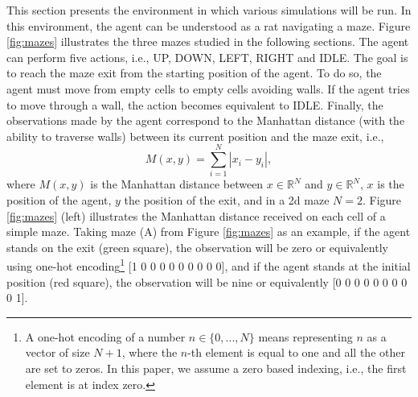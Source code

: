\documentclass[twoside,11pt]{article}
\begin{document}
This section presents the environment in which various simulations will be run. In this environment, the agent can be understood as a rat navigating a maze. Figure \ref{fig:mazes} illustrates the three mazes studied in the following sections. The agent can perform five actions, i.e., UP, DOWN, LEFT, RIGHT and IDLE. The goal is to reach the maze exit from the starting position of the agent. To do so, the agent must move from empty cells to empty cells avoiding walls. If the agent tries to move through a wall, the action becomes equivalent to IDLE. Finally, the observations made by the agent correspond to the Manhattan distance (with the ability to traverse walls) between its current position and the maze exit, i.e.,
$$M(x, y) = \sum_{i = 1}^N |x_i - y_i|,$$
where $M(x, y)$ is the Manhattan distance between $x \in \mathbb{R}^N$ and $y \in \mathbb{R}^N$, $x$ is the position of the agent, $y$ the position of the exit, and in a 2d maze $N=2$. Figure \ref{fig:mazes} (left) illustrates the Manhattan distance received on each cell of a simple maze. Taking maze (A) from Figure \ref{fig:mazes} as an example, if the agent stands on the exit (green square), the observation will be zero or equivalently using one-hot encoding\footnote{A one-hot encoding of a number $n \in \{0, ..., N\}$ means representing $n$ as a vector of size $N + 1$, where the $n$-th element is equal to one and all the other are set to zeros. In this paper, we assume a zero based indexing, i.e., the first element is at index zero.} [1 0 0 0 0 0 0 0 0 0], and if the agent stands at the initial position (red square), the observation will be nine or equivalently [0 0 0 0 0 0 0 0 0 1].
\end{document}
